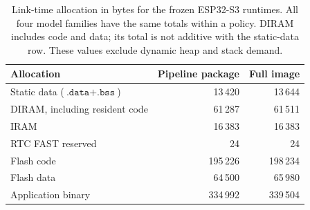 \begin{table}[!htbp]
\caption{Link-time allocation in bytes for the frozen ESP32-S3 runtimes. All four model families have the same totals within a policy. DIRAM includes code and data; its total is not additive with the static-data row. These values exclude dynamic heap and stack demand.}
\label{tab:static-memory}
\centering
\begin{tabular}{lrr}
\toprule
Allocation & Pipeline package & Full image \\
\midrule
Static data ($\texttt{.data}+\texttt{.bss}$) & 13\,420 & 13\,644 \\
DIRAM, including resident code & 61\,287 & 61\,511 \\
IRAM & 16\,383 & 16\,383 \\
RTC FAST reserved & 24 & 24 \\
Flash code & 195\,226 & 198\,234 \\
Flash data & 64\,500 & 65\,980 \\
Application binary & 334\,992 & 339\,504 \\
\bottomrule
\end{tabular}
\end{table}

